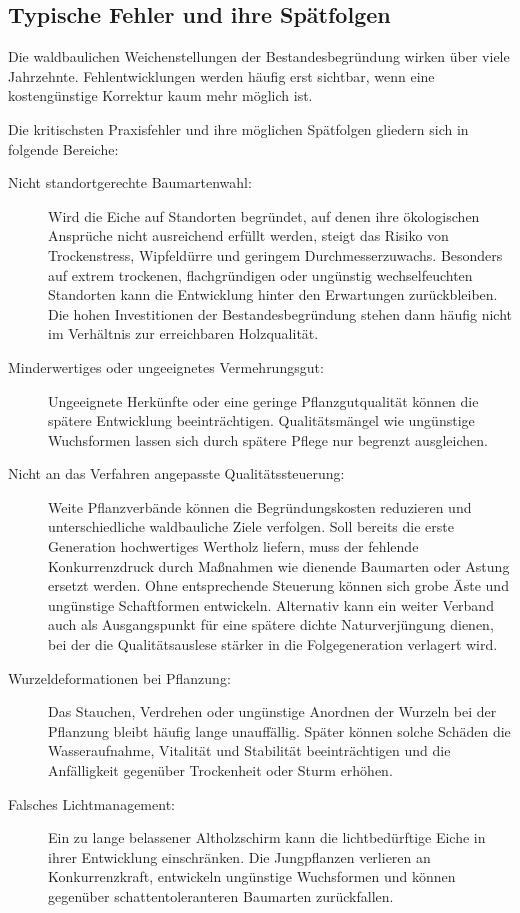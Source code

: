 \documentclass[twocolumn, bibliography=totoc, abstract=true]{scrartcl}
\begin{document}
\subsection{Typische Fehler und ihre Spätfolgen}

Die waldbaulichen Weichenstellungen der Bestandesbegründung wirken über viele Jahrzehnte. Fehlentwicklungen werden häufig erst sichtbar, wenn eine kostengünstige Korrektur kaum mehr möglich ist.

Die kritischsten Praxisfehler und ihre möglichen Spätfolgen gliedern sich in folgende Bereiche:

\begin{description}
\item[Nicht standortgerechte Baumartenwahl:] Wird die Eiche auf Standorten begründet, auf denen ihre ökologischen Ansprüche nicht ausreichend erfüllt werden, steigt das Risiko von Trockenstress, Wipfeldürre und geringem Durchmesserzuwachs. Besonders auf extrem trockenen, flachgründigen oder ungünstig wechselfeuchten Standorten kann die Entwicklung hinter den Erwartungen zurückbleiben. Die hohen Investitionen der Bestandesbegründung stehen dann häufig nicht im Verhältnis zur erreichbaren Holzqualität.
\item[Minderwertiges oder ungeeignetes Vermehrungsgut:] Ungeeignete Herkünfte oder eine geringe Pflanzgutqualität können die spätere Entwicklung beeinträchtigen. Qualitätsmängel wie ungünstige Wuchsformen lassen sich durch spätere Pflege nur begrenzt ausgleichen.
\item[Nicht an das Verfahren angepasste Qualitätssteuerung:] Weite Pflanzverbände können die Begründungskosten reduzieren und unterschiedliche waldbauliche Ziele verfolgen. Soll bereits die erste Generation hochwertiges Wertholz liefern, muss der fehlende Konkurrenzdruck durch Maßnahmen wie dienende Baumarten oder Astung ersetzt werden. Ohne entsprechende Steuerung können sich grobe Äste und ungünstige Schaftformen entwickeln. Alternativ kann ein weiter Verband auch als Ausgangspunkt für eine spätere dichte Naturverjüngung dienen, bei der die Qualitätsauslese stärker in die Folgegeneration verlagert wird.
\item[Wurzeldeformationen bei Pflanzung:] Das Stauchen, Verdrehen oder ungünstige Anordnen der Wurzeln bei der Pflanzung bleibt häufig lange unauffällig. Später können solche Schäden die Wasseraufnahme, Vitalität und Stabilität beeinträchtigen und die Anfälligkeit gegenüber Trockenheit oder Sturm erhöhen.
\item[Falsches Lichtmanagement:] Ein zu lange belassener Altholzschirm kann die lichtbedürftige Eiche in ihrer Entwicklung einschränken. Die Jungpflanzen verlieren an Konkurrenzkraft, entwickeln ungünstige Wuchsformen und können gegenüber schattentoleranteren Baumarten zurückfallen.

\end{description}
\end{document}

